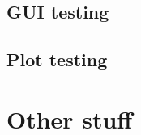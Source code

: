 \documentclass[a4paper, oneside, 11pt]{report}
\begin{document}
\section{GUI testing}

\section{Plot testing}

\chapter{Other stuff}
\label{app:other}
\end{document}
